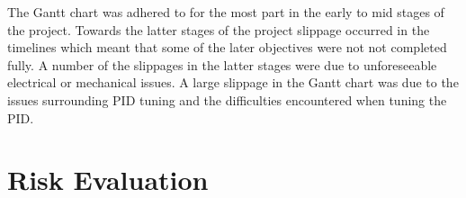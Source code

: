The Gantt chart was adhered to for the most part in the early to 
mid stages of the project. Towards the latter stages of the 
project slippage occurred in the timelines which meant that some 
of the later objectives were not not completed fully. A number 
of the slippages in the latter stages were due to unforeseeable 
electrical or mechanical issues. A large slippage in the Gantt 
chart was due to the issues surrounding PID tuning and the 
difficulties encountered when tuning the PID. 



\section{Risk Evaluation}\label{pm/riskeval}

